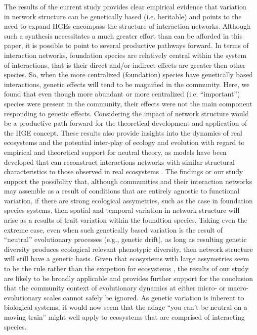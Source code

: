 \documentclass[fleqn,12pt]{olplainarticle}
\begin{document}
The results of the current study provides clear empirical evidence
that variation in network structure can be genetically based
(i.e. heritable) and points to the need to expand IIGEs encompass the
structure of interaction networks. Although such a synthesis
necessitates a much greater effort than can be afforded in this paper,
it is possible to point to several productive pathways forward. In
terms of interaction networks, foundation species are relatively
central within the system of interactions, that is their direct and/or
indirect effects are greater then other species. So, when the more
centralized (foundation) species have genetically based interactions,
genetic effects will tend to be magnified in the community. Here, we
found that even though more abundant or more centralized
(i.e. ``important'') species were present in the community, their
effects were not the main component responding to genetic
effects. Considering the impact of network structure would be a
productive path forward for the theoretical development and
application of the IIGE concept. These results also provide insights
into the dynamics of real ecosystems and the potential inter-play of
ecology and evolution with regard to empirical and theoretical support
for neutral theory, as models have been developed that can reconstruct
interactions networks with similar structural characteristics to those
observed in real ecosystems \cite{Coelho2018NeutralInteractions}. The
findings or our study support the possibility that, although
communities and their interaction networks may assemble as a result of
conditions that are entirely agnostic to functional variation, if
there are strong ecological assymetries, such as the case in
foundation species systems, then spatial and temporal variation in
network structure will arise as a results of trait variation within
the foundtion species. Taking even the extreme case, even when such
genetically based variation is the result of ``neutral'' evolutionary
processes (e.g., genetic drift), as long as resulting genetic
diversity produces ecological relevant phenotypic diversity, then
network structure will still have a genetic basis. Given that
ecosystems with large assymetries seem to be the rule rather than the
excpetion for ecosystems \cite{Ellison2005,
  Santamaria2007LinkageBarriers, Staniczenko2013TheNetworks,
  Dormann2017IdentifyingLimitations, Coelho2018NeutralInteractions},
the results of our study are likely to be broadly applicable and
provides further support for the conclusion that the community context
of evolutionary dynamics at either micro- or macro-evolutionary scales
\cite{Weber2017EvolutionMacroevolution, Harmon2019DetectingInteractions} cannot safely be
ignored. As genetic variation is inherent to biological systems, it
would now seem that the adage ``you can't be neutral on a moving
train'' might well apply to ecosystems that are comprised of
interacting species.
\end{document}
